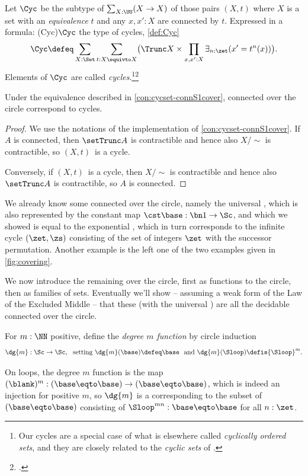 \begin{definition}\label{def:Cyc}
  Let $\Cyc$ be the subtype of $\sum_{X:\UU}(X\to X)$ of those
  pairs $(X,t)$ where $X$ is a \emph{\nonempty} set with an
  \emph{equivalence} $t$ and any $x,x':X$ are connected by $t$.
  Expressed in a formula: \glossary(Cyc){$\protect\Cyc$}%
  {the type of cycles, \cref{def:Cyc}} 
\[
\Cyc \defeq \sum_{X:\Set}\sum_{t:X\equivto X} \bigl( {\Trunc X} \times
            \prod_{x,x':X}\exists_{n:\zet}(x'=t^n(x))\bigr).
\]
  Elements of $\Cyc$ are called \emph{cycles}.\footnote{%
    Our cycles are a special case of what is elsewhere called
    \emph{cyclically ordered sets},
    and they are closely related to the \emph{cyclic sets} of
    \citeauthor{Connes1983}\footnotemark{}.}\footcitetext{Connes1983}
\end{definition}
\begin{corollary}\label{thm:cycset-connS1cover}
  Under the equivalence described in \cref{con:cycset-connS1cover},
  connected \coverings over the circle correspond to cycles.
\end{corollary}
\begin{proof}
  We use the notations of the implementation of \cref{con:cycset-connS1cover}.
  If $A$ is connected, then $\setTrunc A$ is contractible and hence also
  $X/\sim$ is contractible, so $(X,t)$ is a cycle.

  Conversely, if $(X,t)$ is a cycle, then $X/\sim$ is contractible
  and hence also $\setTrunc A$ is contractible, so $A$ is connected.
\end{proof}

We already know some connected \coverings over the circle,
namely the universal \covering, which is also represented by
the constant map $\cst\base:\bn 1\to\Sc$, and which we showed
is equal to the exponential \covering, which in turn corresponds
to the infinite cycle $(\zet,\zs)$
consisting of the set of integers $\zet$ with the successor permutation.
Another example is the left one of the two examples given in
\cref{fig:covering}.

We now introduce the remaining \coverings over the circle, first as functions to the circle, then as families of sets.
Eventually we'll show -- assuming a weak form
of the Law of the Excluded Middle -- that these (with the universal \covering)
are all the decidable connected \coverings over the circle.

\begin{definition}\label{def:dgm-map}
For $m:\NN$ positive, define the \emph{degree $m$ function} by circle induction
\[
\dg{m}:\Sc\to \Sc, \text{~~setting~}
\dg{m}(\base)\defeq\base \text{~~and~}
\dg{m}(\Sloop)\defis{\Sloop}^m.\qedhere
\]
\end{definition}
On loops, the degree $m$ function is the map
$(\blank)^m : (\base\eqto \base) \to (\base\eqto \base)$,
which is indeed an injection for positive $m$,
so $\dg{m}$ is a \covering corresponding to the subset of $(\base\eqto \base)$ consisting
of ${\Sloop}^{mn} : \base\eqto \base$ for all $n:\zet$.


